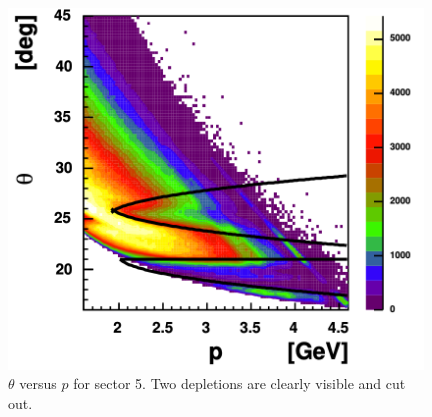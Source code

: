 \begin{figure}[h]
    \begin{center}
        \includegraphics[width=0.98\textwidth ]{img/electron_tp5}
        \caption[ $\theta$ versus $p$ for sector 5]
        { $\theta$ versus $p$ for sector 5. Two depletions are clearly visible and cut out.}
        \label{fig:fidu_etp5}
    \end{center}
\end{figure}


